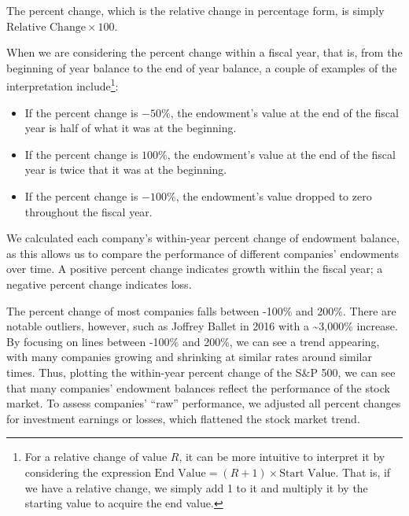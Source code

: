 \documentclass[Dance Data
Project,article,submit,moreauthors,pdftex]{mdpi}
\providecommand{\tightlist}{%
  \setlength{\itemsep}{0pt}\setlength{\parskip}{0pt}}
\begin{document}
The percent change, which is the relative change in percentage form, is
simply \(\text{Relative Change} \times 100\).

When we are considering the percent change within a fiscal year, that
is, from the beginning of year balance to the end of year balance, a
couple of examples of the interpretation include\footnote{For a relative
  change of value \(R\), it can be more intuitive to interpret it by
  considering the expression
  \(\text{End Value} = (R+1) \times \text{Start Value}.\) That is, if we
  have a relative change, we simply add 1 to it and multiply it by the
  starting value to acquire the end value.}:

\begin{itemize}
\tightlist
\item
  If the percent change is \(-50\%\), the endowment's value at the end
  of the fiscal year is half of what it was at the beginning.
\item
  If the percent change is \(100\%\), the endowment's value at the end
  of the fiscal year is twice that it was at the beginning.\\
\item
  If the percent change is \(-100\%\), the endowment's value dropped to
  zero throughout the fiscal year.
\end{itemize}

We calculated each company's within-year percent change of endowment
balance, as this allows us to compare the performance of different
companies' endowments over time. A positive percent change indicates
growth within the fiscal year; a negative percent change indicates loss.

The percent change of most companies falls between -100\% and 200\%.
There are notable outliers, however, such as Joffrey Ballet in 2016 with
a \textasciitilde3,000\% increase. By focusing on lines between -100\%
and 200\%, we can see a trend appearing, with many companies growing and
shrinking at similar rates around similar times. Thus, plotting the
within-year percent change of the S\&P 500, we can see that many
companies' endowment balances reflect the performance of the stock
market. To assess companies' ``raw'' performance, we adjusted all
percent changes for investment earnings or losses, which flattened the
stock market trend.

%
\end{document}
